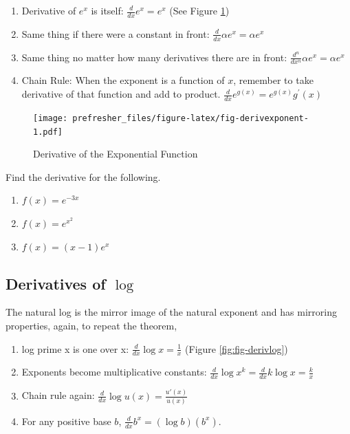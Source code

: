 \documentclass[]{book}
\providecommand{\tightlist}{%
  \setlength{\itemsep}{0pt}\setlength{\parskip}{0pt}}
\theoremstyle{definition}
\theoremstyle{definition}
\theoremstyle{definition}
\theoremstyle{remark}
\let\BeginKnitrBlock\begin \let\EndKnitrBlock\end
\begin{document}
\begin{enumerate}
\def\labelenumi{\arabic{enumi}.}
\tightlist
\item
  Derivative of \(e^x\) is itself: \(\frac{d}{dx}e^x = e^x\) (See Figure \ref{fig:fig-derivexponent})
\item
  Same thing if there were a constant in front: \(\frac{d}{dx}\alpha e^x = \alpha e^x\)
\item
  Same thing no matter how many derivatives there are in front: \(\frac{d^n}{dx^n} \alpha e^x = \alpha e^x\)
\item
  Chain Rule: When the exponent is a function of \(x\), remember to take derivative of that function and add to product. \(\frac{d}{dx}e^{g(x)}= e^{g(x)} g^\prime(x)\)
\end{enumerate}

\begin{figure}
\centering
\texttt{[image: prefresher\_files/figure-latex/fig-derivexponent-1.pdf]}
\caption{\label{fig:fig-derivexponent}Derivative of the Exponential Function}
\end{figure}

\BeginKnitrBlock{example}[Derivative of exponents]
\protect\hypertarget{exm:exmderivexp}{}{\label{exm:exmderivexp} {} }Find the derivative for the following.

\begin{enumerate}
\def\labelenumi{\arabic{enumi}.}
\tightlist
\item
  \(f(x)=e^{-3x}\)
\item
  \(f(x)=e^{x^2}\)
\item
  \(f(x)=(x-1)e^x\)
\end{enumerate}
\EndKnitrBlock{example}

\hypertarget{derivatives-of-log}{%
\subsection*{\texorpdfstring{Derivatives of \(\log\)}{Derivatives of \textbackslash{}log}}\label{derivatives-of-log}}

The natural log is the mirror image of the natural exponent and has mirroring properties, again, to repeat the theorem,

\begin{enumerate}
\def\labelenumi{\arabic{enumi}.}
\tightlist
\item
  log prime x is one over x: \(\frac{d}{dx} \log x = \frac{1}{x}\) (Figure \ref{fig:fig-derivlog})
\item
  Exponents become multiplicative constants: \(\frac{d}{dx} \log x^k = \frac{d}{dx} k \log x = \frac{k}{x}\)
\item
  Chain rule again: \(\frac{d}{dx} \log u(x) = \frac{u'(x)}{u(x)}\quad\)
\item
  For any positive base \(b\), \(\frac{d}{dx} b^x = (\log b)\left(b^x\right)\).
\end{enumerate}
\end{document}
